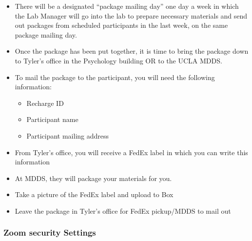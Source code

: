 \documentclass[]{book}
\providecommand{\tightlist}{%
  \setlength{\itemsep}{0pt}\setlength{\parskip}{0pt}}
\begin{document}
\begin{itemize}
\tightlist
\item
  There will be a designated ``package mailing day'' one day a week in which the Lab Manager will go into the lab to prepare necessary materials and send out packages from scheduled participants in the last week, on the same package mailing day.
\item
  Once the package has been put together, it is time to bring the package down to Tyler's office in the Psychology building OR to the UCLA MDDS.
\item
  To mail the package to the participant, you will need the following information:

  \begin{itemize}
  \tightlist
  \item
    Recharge ID
  \item
    Participant name
  \item
    Participant mailing address
  \end{itemize}
\item
  From Tyler's office, you will receive a FedEx label in which you can write this information
\item
  At MDDS, they will package your materials for you.
\item
  Take a picture of the FedEx label and upload to Box
\item
  Leave the package in Tyler's office for FedEx pickup/MDDS to mail out
\end{itemize}

\hypertarget{zoom-security-settings}{%
\subsubsection{Zoom security Settings}\label{zoom-security-settings}}
\end{document}
